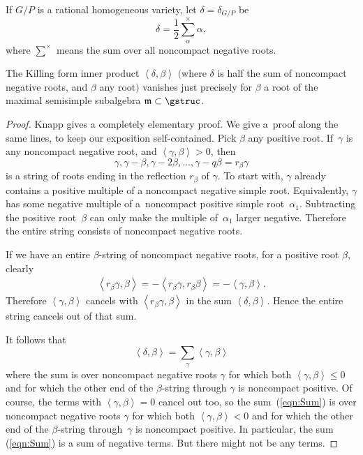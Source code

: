 \begin{definition}
If $G/P$ is a rational homogeneous variety,
let $\delta = \delta_{G/P}$ be
\[
\delta = \frac{1}{2} \sum_{\alpha}^{\times} \alpha,
\]
where $\sum^{\times}$ means the sum over all noncompact negative roots.
\end{definition}

\begin{lemma}
The Killing form inner product
\(
\left<\delta, \beta\right>
\)
$($where $\delta$ is half the sum of noncompact negative roots, and $\beta$
any root$)$ vanishes
just precisely for $\beta$ a root of the
maximal semisimple subalgebra $\mathfrak{m} \subset \gstruc$.
\end{lemma}
\begin{proof} Knapp \cite[Corollary 5.100, p.~330]{Knapp:2002}
gives a completely elementary proof. We give a~proof along
the same lines, to keep our exposition self-contained.
Pick $\beta$ any positive root. If~$\gamma$ is any
noncompact negative root, and $\left<\gamma,\beta\right> > 0$,
then
\[
\gamma, \gamma-\beta, \gamma-2   \beta, \dots, \gamma-q   \beta = r_{\beta} \gamma
\]
is a string of roots ending in the ref\/lection $r_{\beta}$ of $\gamma$.
To start with, $\gamma$ already contains a positive
multiple of a noncompact negative simple root. Equivalently, $\gamma$
has some negative multiple of a~noncompact positive simple root~$\alpha_1$.
Subtracting the positive
root~$\beta$ can only make the multiple of~$\alpha_1$
larger negative. Therefore the entire string consists
of noncompact negative roots.

If we have an entire $\beta$-string of noncompact
negative roots, for a positive
root $\beta$, clearly
\begin{gather*}
\left<r_{\beta} \gamma,\beta\right>
 = -\left<r_{\beta} \gamma, r_{\beta} \beta\right>
 =
-\left<\gamma,\beta\right>.
\end{gather*}
Therefore $\left<\gamma,\beta\right>$ cancels with $\left<r_{\beta}
\gamma,\beta\right>$ in the sum $\left<\delta,\beta\right>$. Hence
the entire string cancels out of that sum.

It follows that
\begin{equation}\label{eqn:Sum}
\left<\delta,\beta\right>=
\sum_{\gamma} \left<\gamma,\beta\right>
\end{equation}
where the sum is over noncompact negative roots $\gamma$
for which both $\left<\gamma,\beta\right> \le 0$
and for which the other end of the $\beta$-string
through $\gamma$ is noncompact positive.
Of course, the terms with  $\left<\gamma,\beta\right> = 0$
cancel out too, so the sum~(\ref{eqn:Sum}) is over
noncompact negative roots $\gamma$ for
which both $\left<\gamma,\beta\right> < 0$
and for which the other end of the $\beta$-string
through~$\gamma$ is noncompact positive. In particular,
the sum (\ref{eqn:Sum}) is a sum of negative terms.
But there might not be any terms.


\end{proof}
